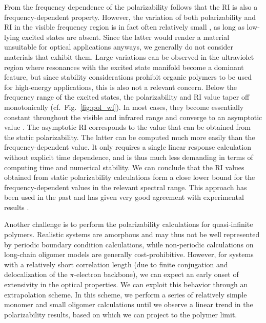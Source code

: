From the frequency dependence of the polarizability follows that the RI is also a frequency-dependent property. However, the variation of both polarizability and RI in the visible frequency region is in fact often relatively small \cite{Robello2013}, as long as low-lying excited states are absent. Since the latter would render a material unsuitable for optical applications anyways, we generally do not consider materials that exhibit them. Large variations can be observed in the ultraviolet region where resonances with the excited state manifold become a dominant feature, but since stability considerations prohibit organic polymers to be used for high-energy applications, this is also not a relevant concern. Below the frequency range of the excited states, the polarizability and RI value taper off monotonically (cf.\ Fig.\ \ref{fig:pol_wl}). In most cases, they become essentially constant throughout the visible and infrared range and converge to an asymptotic value \cite{Robello2013}. The asymptotic RI corresponds to the value that can be obtained from the static polarizability. The latter can be computed much more easily than the frequency-dependent value. It only requires a single linear response calculation without explicit time dependence, and is thus much less demanding in terms of computing time and numerical stability. We can conclude that the RI values obtained from static polarizability calculations form a close lower bound for the frequency-dependent values in the relevant spectral range. This approach has been used in the past and has given very good agreement with experimental results \cite{Azim-Araghi2012,Ksianzou2006,Lee2011,Park2011,Zeinalipour-Yazdi2008}.

Another challenge is to perform the polarizability calculations for quasi-infinite polymers. 
Realistic systems are amorphous and may thus not be well represented by periodic boundary condition calculations, while non-periodic calculations on long-chain oligomer models are generally cost-prohibitive. 
However, for systems with a relatively short correlation length (\eg  due to finite conjugation and delocalization of the $\pi$-electron backbone), we can expect an early onset of extensivity in the optical properties. We can exploit this behavior through an extrapolation scheme. 
In this scheme, we perform a series of relatively simple monomer and small oligomer calculations until we observe a linear trend in the polarizability results, based on which we can project 
to the polymer limit.

